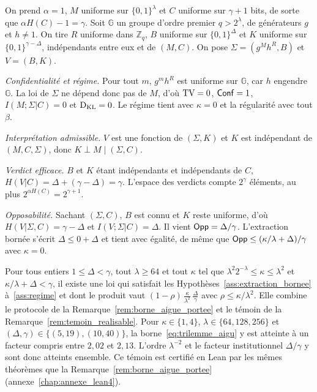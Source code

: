 \begin{sloppypar}
\begin{Preuve}
On prend $\alpha = 1$, $M$ uniforme sur $\{0,1\}^\lambda$ et $C$ uniforme sur $\gamma + 1$ bits, de sorte que
$\alpha H(C) - 1 = \gamma$. Soit $\mathbb{G}$ un
groupe d'ordre premier $q > 2^\lambda$, de g\'en\'erateurs $g$ et $h \neq 1$. On tire $R$
uniforme dans $\mathbb{Z}_q$, $B$ uniforme sur $\{0,1\}^\Delta$ et $K$ uniforme sur
$\{0,1\}^{\gamma-\Delta}$, ind\'ependants entre eux et de $(M,C)$. On pose
$\Sigma = (g^M h^R, B)$ et $V = (B, K)$.

\emph{Confidentialit\'e et r\'egime.} Pour tout $m$, $g^m h^R$ est uniforme sur
$\mathbb{G}$, car $h$ engendre $\mathbb{G}$. La loi de $\Sigma$ ne d\'epend donc pas de $M$,
d'o\`u $\operatorname{TV} = 0$, $\mathsf{Conf} = 1$, $I(M;\Sigma|C) = 0$ et $\operatorname{D_{\text{KL}}} = 0$. Le r\'egime tient avec
$\kappa = 0$ et la r\'egularit\'e avec tout $\beta$.

\emph{Interpr\'etation admissible.} $V$ est une fonction de $(\Sigma, K)$ et $K$ est
ind\'ependant de $(M, C, \Sigma)$, donc $K \perp M \mid (\Sigma, C)$.

\emph{Verdict efficace.} $B$ et $K$ \'etant ind\'ependants et ind\'ependants de $C$,
$H(V|C) = \Delta + (\gamma - \Delta) = \gamma$. L'espace des verdicts compte $2^\gamma$
\'el\'ements, au plus $2^{\alpha H(C)} = 2^{\gamma+1}$.

\emph{Opposabilit\'e.} Sachant $(\Sigma, C)$, $B$ est connu et $K$ reste uniforme, d'o\`u
$H(V|\Sigma,C) = \gamma - \Delta$ et $I(V;\Sigma|C) = \Delta$. Il vient
$\mathsf{Opp} = \Delta/\gamma$. L'extraction born\'ee s'\'ecrit $\Delta \leq 0 + \Delta$ et tient
avec \'egalit\'e, de m\^eme que $\mathsf{Opp} \leq (\kappa/\lambda + \Delta)/\gamma$ avec $\kappa = 0$.
\end{Preuve}

\begin{remark}
\label{rem:temoin_combine}
Pour tous entiers $1 \leq \Delta < \gamma$, tout $\lambda \geq 64$ et tout $\kappa$ tel que
$\lambda^2 2^{-\lambda} \leq \kappa \leq \lambda^2$ et $\kappa/\lambda + \Delta < \gamma$, il existe une loi
qui satisfait les Hypoth\`eses~\ref{ass:extraction_bornee} \`a~\ref{ass:regime} et dont le
produit vaut $(1-\rho)\,\frac{\kappa}{\lambda^2}\,\frac{\Delta}{\gamma}$ avec
$\rho \leq \kappa/\lambda^2$. Elle combine le protocole de la
Remarque~\ref{rem:borne_aigue_portee} et le t\'emoin de la
Remarque~\ref{rem:temoin_realisable}. Pour $\kappa \in \{1,4\}$,
$\lambda \in \{64,128,256\}$ et $(\Delta,\gamma) \in \{(5,19),(10,40)\}$, la
borne~\eqref{eq:trilemme_aigu} y est atteinte \`a un facteur compris entre $2{,}02$ et
$2{,}13$. L'ordre $\lambda^{-2}$ et le facteur institutionnel $\Delta/\gamma$ y sont donc
atteints ensemble. Ce t\'emoin est certifi\'e en Lean par les m\^emes th\'eor\`emes que la
Remarque~\ref{rem:borne_aigue_portee} (annexe~\ref{chap:annexe_lean4}).
\end{remark}


\end{sloppypar}
